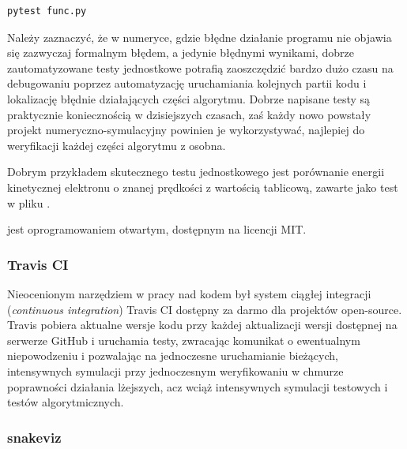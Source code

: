     \begin{lstlisting}[language=Bash]
        pytest func.py
    \end{lstlisting}

    Należy zaznaczyć, że w numeryce, gdzie błędne działanie programu nie
    objawia się zazwyczaj formalnym błędem, a jedynie błędnymi
    wynikami, dobrze zautomatyzowane testy jednostkowe potrafią zaoszczędzić
    bardzo dużo czasu na debugowaniu poprzez automatyzację uruchamiania
    kolejnych partii kodu i lokalizację błędnie działających części algorytmu.
    Dobrze napisane testy są praktycznie koniecznością w dzisiejszych czasach,
    zaś każdy nowo powstały projekt numeryczno-symulacyjny powinien je
    wykorzystywać, najlepiej do weryfikacji każdej części algorytmu z osobna.

    Dobrym przykładem skutecznego testu jednostkowego jest porównanie energii kinetycznej
    elektronu o znanej prędkości z wartością tablicową, zawarte jako test w pliku
    .

     jest oprogramowaniem otwartym, dostępnym na licencji MIT.

    \subsubsection{Travis CI}
    Nieocenionym narzędziem w pracy nad kodem był system ciągłej integracji
    (\emph{continuous integration}) Travis CI \cite{travisci}
    dostępny za
    darmo dla projektów open-source. Travis pobiera aktualne wersje kodu przy
    każdej aktualizacji wersji dostępnej na serwerze GitHub i uruchamia testy,
    zwracając komunikat o ewentualnym niepowodzeniu i pozwalając na jednoczesne
    uruchamianie bieżących, intensywnych symulacji przy jednoczesnym
    weryfikowaniu w chmurze poprawności działania lżejszych, acz wciąż intensywnych
    symulacji testowych i testów algorytmicznych.

    \subsubsection{snakeviz}

